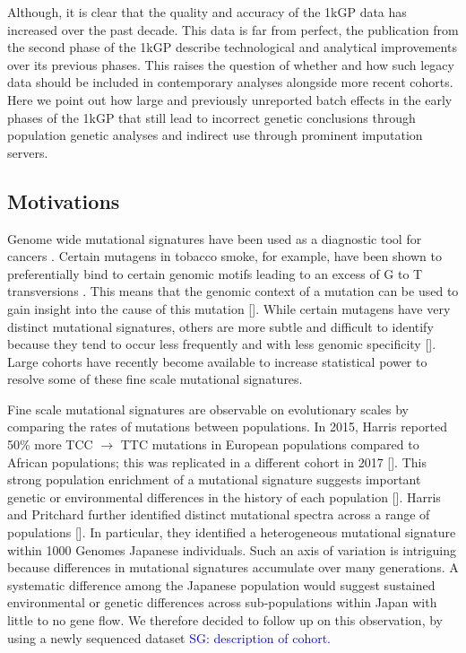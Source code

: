 \documentclass[9pt,lineno]{elife}
\newcommand{\sgcomment}[1]{\textcolor{blue}{SG: #1}}
\begin{document}
Although, it is clear that the quality and accuracy of the 1kGP data has increased over the past decade. 
This data is far from perfect, the publication from the second phase of the 1kGP describe technological and analytical improvements over its previous phases.
This raises the question of whether and how such legacy data should be included in contemporary analyses alongside more recent cohorts. 
Here we point out how large and previously unreported batch effects in the early phases of the 1kGP that still lead to incorrect genetic conclusions through population genetic analyses and indirect use through prominent imputation servers.  

\subsection{Motivations}

Genome wide mutational signatures have been used as a diagnostic tool for cancers \cite{Pleasance2010,Shiraishi2015a}.
Certain mutagens in tobacco smoke, for example, have been shown to preferentially bind to certain genomic motifs leading to an excess of G to T transversions \cite{Pleasance2010}.
This means that the genomic context of a mutation can be used to gain insight into the cause of this mutation [\cite{}].
While certain mutagens have very distinct mutational signatures, others are more subtle and difficult to identify because they tend to occur less frequently and with less genomic specificity [\cite{}].
Large cohorts have recently become available to increase statistical power to resolve some of these fine scale mutational signatures.

Fine scale mutational signatures are observable on evolutionary scales by comparing the rates of mutations between populations.
In 2015, Harris reported 50\% more TCC ${\rightarrow}$ TTC mutations in European populations compared to African populations; this was replicated in a different cohort in 2017 [\cite{}].
This strong population enrichment of a mutational signature suggests important genetic or environmental differences in the history of each population [\cite{}]. 
Harris and Pritchard further identified distinct mutational spectra across a range of populations [\cite{}]. 
In particular, they identified a heterogeneous mutational signature within 1000 Genomes Japanese individuals. 
Such an axis of variation is intriguing because differences in mutational signatures accumulate over many generations. 
A systematic difference among the Japanese population would suggest sustained environmental or genetic differences across sub-populations within Japan with little to no gene flow.
We therefore decided to follow up on this observation, by using a newly sequenced dataset \sgcomment{description of cohort.}
\end{document}
